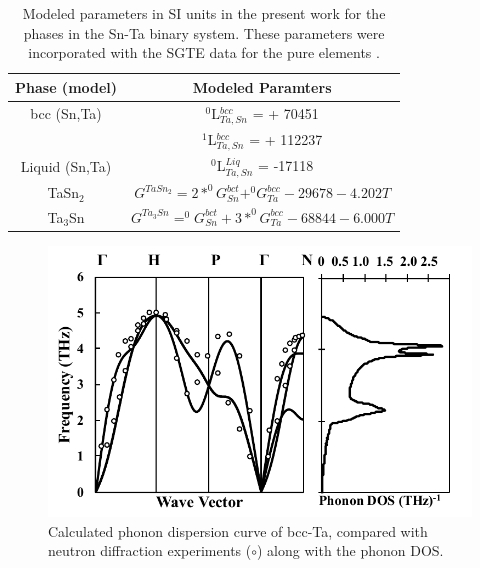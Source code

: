\newpage
\begin{table}[H]
 	\caption{Modeled parameters in SI units in the present work for the phases in the Sn-Ta binary system. These parameters were incorporated with the SGTE data for the pure elements \cite{Dinsdale1991}.}
 	\centering
 	\begin{tabular}{ c c }
 		\hline
 		Phase (model) & Modeled Paramters\\
 		\hline
 		bcc (Sn,Ta) & $^0$L$_{Ta,Sn}^{bcc}$ = + 70451\\
 		 & $^1$L$_{Ta,Sn}^{bcc}$ = + 112237\\
 		 Liquid (Sn,Ta) & $^0$L$_{Ta,Sn}^{Liq}$ = -17118\\
 		 TaSn$_2$ & $G^{TaSn_{2}} = 2*^0G_{Sn}^{bct} + ^{0}G_{Ta}^{bcc} -29678 - 4.202T$ \\
 		 Ta$_3$Sn & $G^{Ta_{3}Sn} = ^0G_{Sn}^{bct} + 3*^{0}G_{Ta}^{bcc} -68844 - 6.000T$ \\
 		\hline
 	\end{tabular}
 	\label{Ch4-table:ip}
 \end{table}
 \clearpage

\pagebreak
\begin{figure}[H]
	\centering
	\includegraphics[width=\textwidth]{Chapter-4/Figures/Taphonondos.pdf}
	\caption{Calculated phonon dispersion curve of bcc-Ta, compared with neutron diffraction experiments ($\circ$) \cite{Taioli2007a} along with the phonon DOS.}
	\label{Ch4-figure:Taphonon}
\end{figure}

